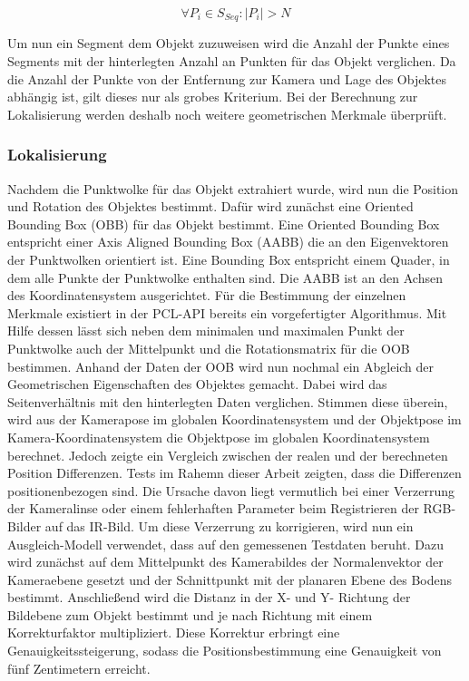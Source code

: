 \begin{equation}
\forall P_i \in S_{Seq}: |P_i| > N 
\end{equation}

Um nun ein Segment dem Objekt zuzuweisen wird die Anzahl der Punkte eines Segments mit der hinterlegten Anzahl an Punkten für das Objekt verglichen. Da die Anzahl der Punkte von der Entfernung zur Kamera und Lage des Objektes abhängig ist, gilt dieses nur als grobes Kriterium. Bei der Berechnung zur Lokalisierung werden deshalb noch weitere geometrischen Merkmale überprüft.

\subsubsection{Lokalisierung}
Nachdem die Punktwolke für das Objekt extrahiert wurde, wird nun die Position und Rotation des Objektes bestimmt. Dafür wird zunächst eine Oriented Bounding Box (OBB) für das Objekt bestimmt. Eine Oriented Bounding Box entspricht einer Axis Aligned Bounding Box (AABB) die an den Eigenvektoren der Punktwolken orientiert ist. Eine Bounding Box entspricht einem Quader, in dem alle Punkte der Punktwolke enthalten sind. Die AABB ist an den Achsen des Koordinatensystem ausgerichtet. Für die Bestimmung der einzelnen Merkmale existiert in der PCL-API bereits ein vorgefertigter Algorithmus. Mit Hilfe dessen lässt sich neben dem minimalen und maximalen Punkt der Punktwolke auch der Mittelpunkt und die Rotationsmatrix für die OOB bestimmen. Anhand der Daten der OOB wird nun nochmal ein Abgleich der Geometrischen Eigenschaften des Objektes gemacht. Dabei wird das Seitenverhältnis mit den hinterlegten Daten verglichen. Stimmen diese überein, wird aus der Kamerapose im globalen Koordinatensystem und der Objektpose im Kamera-Koordinatensystem die Objektpose im globalen Koordinatensystem berechnet. Jedoch zeigte ein Vergleich zwischen der realen und der berechneten Position Differenzen. Tests im Rahemn dieser Arbeit zeigten, dass die Differenzen positionenbezogen sind. Die Ursache davon liegt vermutlich bei einer Verzerrung der Kameralinse oder einem fehlerhaften Parameter beim Registrieren der RGB-Bilder auf das IR-Bild. Um diese Verzerrung zu korrigieren, wird nun ein Ausgleich-Modell verwendet, dass auf den gemessenen Testdaten beruht. Dazu wird zunächst auf dem Mittelpunkt des Kamerabildes der Normalenvektor der Kameraebene gesetzt und der Schnittpunkt mit der planaren Ebene des Bodens bestimmt. Anschließend wird die Distanz in der X- und Y- Richtung der Bildebene zum Objekt bestimmt und je nach Richtung mit einem Korrekturfaktor multipliziert. Diese Korrektur erbringt eine Genauigkeitssteigerung, sodass die Positionsbestimmung eine Genauigkeit von fünf Zentimetern erreicht. 

